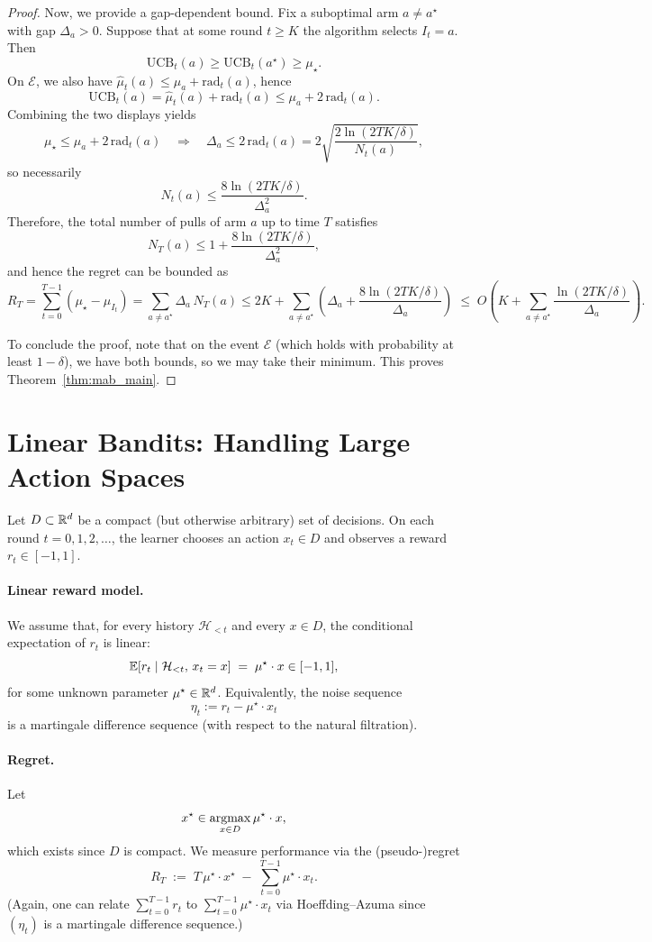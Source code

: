 \begin{proof}
Now, we provide a gap-dependent bound.
Fix a suboptimal arm $a\neq a^\star$ with gap $\Delta_a>0$.
Suppose that at some round $t\ge K$ the algorithm selects $I_t=a$.
Then
\[
\mathrm{UCB}_t(a)\ge \mathrm{UCB}_t(a^\star)\ge \mu_\star.
\]
On $\mathcal{E}$, we also have $\widehat\mu_t(a)\le \mu_a+\mathrm{rad}_t(a)$, hence
\[
\mathrm{UCB}_t(a) = \widehat\mu_t(a)+\mathrm{rad}_t(a)
\le \mu_a + 2\,\mathrm{rad}_t(a).
\]
Combining the two displays yields
\[
\mu_\star \le \mu_a + 2\,\mathrm{rad}_t(a)
\quad\Rightarrow\quad
\Delta_a \le 2\,\mathrm{rad}_t(a)
=2\sqrt{\frac{2\ln(2TK/\delta)}{N_t(a)}},
\]
so necessarily
\[
N_t(a) \le \frac{8\ln(2TK/\delta)}{\Delta_a^2}.
\]
Therefore, the total number of pulls of arm $a$ up to time $T$ satisfies
\[
N_T(a)\le 1 + \frac{8\ln(2TK/\delta)}{\Delta_a^2},
\]
and hence the regret can be bounded as
\[
R_T = \sum_{t=0}^{T-1}(\mu_\star-\mu_{I_t})
= \sum_{a\neq a^\star} \Delta_a\,N_T(a)
\le 2K + \sum_{a\neq a^\star}\left(\Delta_a + \frac{8\ln(2TK/\delta)}{\Delta_a}\right)
\;\le\; O\!\left(K + \sum_{a\neq a^\star}\frac{\ln(2TK/\delta)}{\Delta_a}\right).
\]

To conclude the proof, note that on the event $\mathcal{E}$ (which holds with probability at least $1-\delta$),
we have both bounds, so we may take their minimum.
This proves Theorem~\ref{thm:mab_main}.
\end{proof}

\section{Linear Bandits: Handling Large Action Spaces}
\label{sec:linear_bandits}

Let $D \subset \mathbb{R}^d$ be a compact (but otherwise arbitrary) set of decisions.
On each round $t=0,1,2,\dots$, the learner chooses an action $x_t \in D$ and
observes a reward $r_t \in [-1,1]$.

\paragraph{Linear reward model.}
We assume that, for every history $\mathcal{H}_{<t}$ and every $x\in D$,
the conditional expectation of $r_t$ is linear:
\[
\mathbb{E}[r_t \mid \mathcal{H}_{<t},\, x_t=x] \;=\; \mu^\star \cdot x \in [-1,1],
\]
for some unknown parameter $\mu^\star\in\mathbb{R}^d$.
Equivalently, the noise sequence
\[
\eta_t := r_t - \mu^\star\cdot x_t
\]
is a martingale difference sequence (with respect to the natural filtration).

\paragraph{Regret.}
Let
\[
x^\star \in \operatorname*{argmax}_{x\in D}\mu^\star\cdot x,
\]
which exists since $D$ is compact.
We measure performance via the (pseudo-)regret
\[
R_T \;:=\; T\,\mu^\star\cdot x^\star \;-\; \sum_{t=0}^{T-1}\mu^\star\cdot x_t.
\]
(Again, one can relate $\sum_{t=0}^{T-1} r_t$ to $\sum_{t=0}^{T-1}\mu^\star\cdot x_t$
via Hoeffding--Azuma since $(\eta_t)$ is a martingale difference sequence.)

